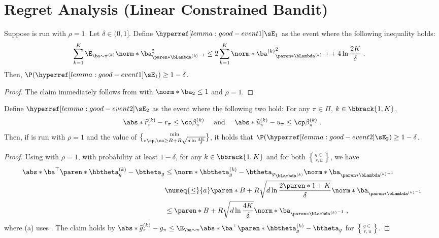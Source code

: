 \section{Regret Analysis (Linear Constrained Bandit)}\label{sec:regret-analysis-bandit}

\begin{lemma}\label{lemma:good-event1}
Suppose  is run with $\rho = 1$.
Let $\delta \in (0, 1]$.
Define $\rmvEventBandit$ as the event where the following inequality holds: 
\begin{align*}
&\sum_{k =1}^K
\E_{\ba \sim \pi^{(k)}} \norm*{\ba}^2_{\paren*{\bLambda^{(k)}}^{-1}} 
\leq 2\sum_{k =1 }^K
\norm*{\ba^{(k)}}^2_{\paren*{\bLambda^{(k)}}^{-1}}
+ 4 \ln \frac{2K}{\delta} \;.
\end{align*}
Then, $\P(\rmvEventBandit) \geq 1 - \delta$.
\end{lemma}
\begin{proof}
The claim immediately follows from  with $\norm*{\ba}_2\leq 1$ and $\rho=1$.
\end{proof}

\begin{lemma}\label{lemma:good-event2}
Define $\confeventBandit$ as the event where the following two hold:
For any $\pi \in \Pi$, $k \in \bbrack{1, K}$,
$$
\abs*{\widehat{r}^{(k)}_\pi - r_\pi} \leq \co \beta^{(k)}_\pi
\quad\text{ and }\quad
\abs*{\widehat{u}^{(k)}_\pi - u_\pi} \leq \cp \beta^{(k)}_\pi\;.
$$
Then, if  is run with $\rho = 1$ and the value of $\min\brace*{\cp, \co} \geq B + R\sqrt{d \ln \frac{4K}{\delta}}$, it holds that $\P(\confeventBandit) \geq 1 - \delta$.
\end{lemma}
\begin{proof}
Using  with $\rho = 1$, with probability at least $1-\delta$, for any $k \in \bbrack{1, K}$ and for both $g \in \brace{r, u}$, we have
\begin{align*}
\abs*{\ba^\top \paren*{\hbtheta^{(k)}_g - \btheta_g}} 
&\leq
\norm*{\hbtheta^{(k)}_g - \btheta_g}_{\bLambda^{(k)}}
\norm*{\ba}_{\paren*{\bLambda^{(k)}}^{-1}}\\
&\numeq{\leq}{a}
\paren*{B + R\sqrt{d \ln \frac{2\paren*{1 + K}}{\delta}}} \norm*{\ba}_{\paren*{\bLambda^{(k)}}^{-1}}\\
&\leq
\paren*{B + R\sqrt{d \ln \frac{4K}{\delta}}} \norm*{\ba}_{\paren*{\bLambda^{(k)}}^{-1}}\;,
\end{align*}
where (a) uses .
The claim holds by \(
\abs*{\widehat{g}^{(k)}_{\pi} - g_{\pi}}
\leq \E_{\ba \sim \pi}\abs*{\ba^\top \paren*{\hbtheta^{(k)}_g - \btheta_g}}
\) for $g \in \brace{r, u}$. 
\end{proof}

